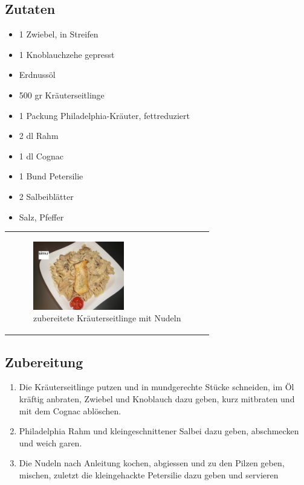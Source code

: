 \documentclass[a4paper,abstracton]{scrreprt}
\begin{document}
\begin{minipage}{0.45\textwidth}

\subsection{Zutaten}
\begin{itemize}
\item 1 Zwiebel, in Streifen
\item 1 Knoblauchzehe gepresst
\item Erdnussöl
\item 500 gr Kräuterseitlinge
\item 1 Packung Philadelphia-Kräuter, fettreduziert
\item 2 dl Rahm
\item 1 dl Cognac
\item 1 Bund Petersilie
\item 2 Salbeiblätter
\item Salz, Pfeffer
\end{itemize}
\end{minipage}%
\begin{minipage}{0.45\textwidth}
\begin{tabular}{p{\textwidth}}

\begin{figure}[H]
\centering
\includegraphics[width=150px]{rezept}
\caption[zubereitete Kräuterseitlinge mit Nudeln]{zubereitete Kräuterseitlinge mit Nudeln\protect\footnotemark}
\label{fig:rezept}
\end{figure}

\end{tabular}
\end{minipage}%

\subsection{Zubereitung}
\begin{enumerate}
\item Die Kräuterseitlinge putzen und in mundgerechte Stücke schneiden, im Öl kräftig anbraten, Zwiebel und Knoblauch dazu geben, kurz mitbraten und mit dem Cognac ablöschen.
\item Philadelphia Rahm und kleingeschnittener Salbei dazu geben, abschmecken und weich garen.
\item Die Nudeln nach Anleitung kochen, abgiessen und zu den Pilzen geben, mischen, zuletzt die kleingehackte Petersilie dazu geben und servieren
\end{enumerate}

\printbibliography[heading=lit]
\end{document}
